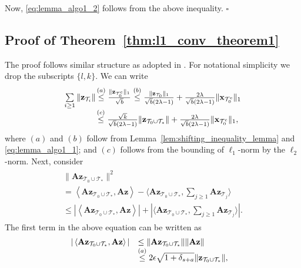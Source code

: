\documentclass[journal]{IEEEtran}
\newcommand{\mbx}{\mathbf{x}}
\newcommand{\mbA}{\mathbf{A}}
\newcommand{\mbz}{\mathbf{z}}
\newcommand{\T}{\mathcal{T}}
\newcommand*{\QEDB}{\hfill\ensuremath{\square}}%
\begin{document}
Now, \eqref{eq:lemma_algo1_2} follows from the above inequality. \QEDB

\subsection{Proof of Theorem~\ref{thm:l1_conv_theorem1}}
The proof follows similar structure as adopted in \cite[Theorem 2]{Cai_Shifting_Inequality_TSP_2010}. For notational simplicity we drop the subscripts $\{l,k\}$. We can write
\begin{eqnarray}
\label{eq:l1_conv_inequality1}
\begin{array}{rl}
\sum\limits_{i \geq 1} \|\mbz_{\T_i}\| & \hspace{-3mm}\stackrel{(a)}{\leq}  \frac{\|\mbz_{\T_0^c}\|_1}{\sqrt{b}} \stackrel{(b)}{\leq} \frac{\|\mbz_{\T_0}\|_1}{\sqrt{b}(2\lambda -1)} + \frac{2\lambda}{\sqrt{b}(2\lambda -1)}\|\mbx_{\T_0^c}\|_1 \\
& \hspace{-3mm} \stackrel{(c)}{\leq} \frac{\sqrt{k}}{\sqrt{b}(2\lambda -1)}\|\mbz_{\T_0 \cup \T_*}\| + \frac{2\lambda}{\sqrt{b}(2\lambda -1)}\|\mbx_{\T_0^c}\|_1,
\end{array}
\end{eqnarray}
where $(a)$ and $(b)$ follow from Lemma~\ref{lem:shifting_inequality_lemma} and \eqref{eq:lemma_algo1_1}; and $(c)$ follows from the bounding of $\ell_1$-norm by the $\ell_2$-norm. Next, consider
\begin{eqnarray}
\label{eq:bound_equation_4}
\begin{array}{l}
\|\mbA \mbz_{\T_0 \cup \T_*}\|^2 \\
 =  \left\langle \mbA\mbz_{\T_0 \cup \T_*},\mbA \mbz\right\rangle - \langle \mbA \mbz_{\T_0 \cup \T_*},\sum_{j \geq 1}\mbA \mbz_{\T_j}\rangle \\
 \leq  |\left\langle \mbA\mbz_{\T_0 \cup \T_*},\mbA \mbz\right\rangle| + |\langle \mbA\mbz_{\T_0 \cup \T_*},\sum_{j \geq 1}\mbA \mbz_{\T_j}\rangle|.
 \end{array}
\end{eqnarray}
The first term in the above equation can be written as
\begin{eqnarray*}
\begin{array}{rl}
\hspace{-3mm}|\left\langle \mbA\mbz_{\T_0 \cup \T_*},\mbA \mbz\right\rangle|  
& \leq  \|\mbA\mbz_{\T_0 \cup \T_*}\| \|\mbA \mbz\|\\
&  \stackrel{(a)}{\leq} 2 \epsilon \sqrt{1+\delta_{s+a}} \|\mbz_{\T_0 \cup \T_*}\|,
\end{array}
\end{eqnarray*}
\end{document}
